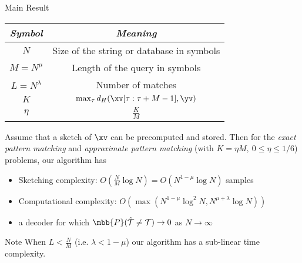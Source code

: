 	 \begin{frame}{Main Result}
	{\small
	\begin{table}[h!]
		\label{Table:Notations}
		\begin{center}
			\begin{tabular}{|c|c|} 	
				\hline		
				\textit{Symbol}		&  \textit{Meaning} \\		
				\hline
				$N$           		& Size of the string or database in symbols \\
				\hline
				$M = N^{\mu}$       & Length of the query in symbols \\
				\hline
				$L = N^\lambda$    &   Number of matches \\
				\hline
				$K$             &$\max_{\tau}d_{H}(\xv[\tau:\tau+M-1],\yv)$\\
				\hline
				$\eta$             &$\frac{K}{M}$\\
				\hline
			\end{tabular}
		\end{center}
	\end{table}
    }	 	
    \vspace{-10mm}
	 \begin{theorem}
	 	Assume that a sketch of $\xv$ can be precomputed and stored. Then for the {\it exact pattern matching} and {\it approximate pattern matching} (with $K = \eta M,~ 0 \leq \eta \leq 1/6$) problems, our algorithm has
	 	\begin{itemize}
	 		\item \alert{Sketching complexity:} {\color{blue} $O(\frac{N}{M}\log N)=O(N^{1-\mu}\log N)$} \alert{samples}
	 		\item \alert{Computational complexity:} 
	 		{\color{blue}$O(\max(N^{1-\mu}\log^2 N, N^{\mu+\lambda}\log N ))$}	 		
	 		\item a decoder for which $\mbb{P}(\hat{{\mathcal{T}}} \neq \mathcal{T}) \rightarrow 0$ as $N \rightarrow \infty$
	 	\end{itemize}
	 \end{theorem}
	 \pause
	 \begin{block}{\alert{Note}}
	 	When $L<\frac{N}{M}$ (i.e. $\lambda<1-\mu$) our algorithm has a {\color{blue}sub-linear time} complexity.
	 \end{block}	
\end{frame}	


